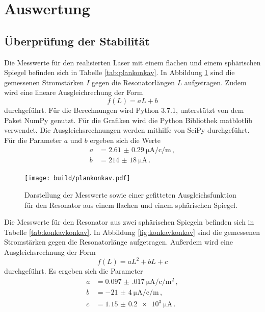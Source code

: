 \section{Auswertung}
\label{sec:Auswertung}

\subsection{Überprüfung der Stabilität}
\label{subsec:stabilitaet}
Die Messwerte für den realisierten Laser mit einem flachen und einem sphärischen
Spiegel befinden sich in Tabelle \ref{tab:plankonkav}. In Abbildung \ref{fig:plankonkav}
sind die gemessenen Stromstärken $I$ gegen die Resonatorlängen $L$ aufgetragen.
Zudem wird eine lineare Ausgleichrechung der Form
\begin{equation*}
  f(L)=a L+b
\end{equation*}
durchgeführt. Für die Berechnungen wird Python 3.7.1, unterstützt von dem Paket
NumPy \cite{numpy} genutzt. Für die Grafiken
wird die Python Bibliothek matblotlib \cite{matplotlib} verwendet.
Die Ausgleichsrechnungen werden mithilfe von SciPy \cite{scipy} durchgeführt.
Für die Parameter $a$ und $b$ ergeben sich die Werte
\begin{align*}
  a&= \SI{2.61(029)}{\micro\ampere\per\centi\per\metre}\,,\\
  b&= \SI{214(18)}{\micro\ampere}\,.
\end{align*}

\begin{figure}
  \centering
  \texttt{[image: build/plankonkav.pdf]}
  \caption{Darstellung der Messwerte sowie einer gefitteten Ausgleichsfunktion für den
  Resonator aus einem flachen und einem sphärischen Spiegel.}
  \label{fig:plankonkav}
\end{figure}

Die Messwerte für den Resonator aus zwei sphärischen Spiegeln befinden sich in
Tabelle \ref{tab:konkavkonkav}. In Abbildung \ref{fig:konkavkonkav} sind die gemessenen Stromstärken gegen die Resonatorlänge aufgetragen. Außerdem wird eine
Ausgleichsrechnung der Form
\begin{equation*}
  f(L)=a L^2 + b L + c
\end{equation*}
durchgeführt. Es ergeben sich die Parameter
\begin{align*}
  a&= \SI{0.097(017)}{\micro\ampere\per\centi\per\metre\squared}\,, \\
  b&= \SI{-21(4)}{\micro\ampere\per\centi\per\metre}\,, \\
  c&= \SI{1.15(020)e3}{\micro\ampere}\,.
\end{align*}

